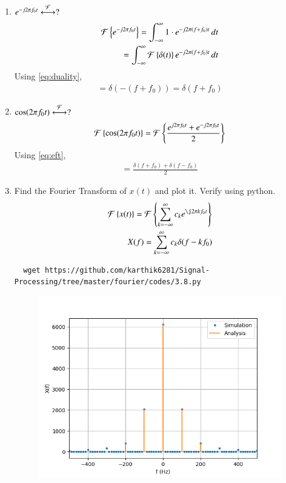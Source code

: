 \documentclass[journal,12pt,twocolumn]{IEEEtran}
\renewcommand\thesection{\arabic{section}}
\begin{document}
\begin{enumerate}[label=\thesection.\arabic*
,ref=\thesection.\theenumi]
\begin{align}
 \end{align}
 Since $e^{-j2\pi ft}=1$ for t=0 and remaining integrand is zero for t $\neq0$.
 \begin{align}
  =\int_{-\infty}^{\infty}\delta(t)\,dt\\
  =1
 \end{align}
 \item $e^{-j2\pi f_0t}\overset{\mathcal{F}}{ \longleftrightarrow}?$\\
 \solution 
 \begin{align}
 \mathcal{F}\left\{e^{-j2\pi f_0t}\right\}=\int_{-\infty}^{\infty}1\cdot e^{-j2\pi\left(f+f_0\right)t}\,dt\\
 =\int_{-\infty}^{\infty}\mathcal{F}\left\{\delta(t)\right\} e^{-j2\pi\left(f+f_0\right)t}\,dt
 \end{align}
 Using \eqref{eq:duality},
 \begin{align}
 \label{eq:eft}
 =\delta(-(f+f_0))=\delta(f+f_0)
 \end{align}
 \item $\cos(2\pi f_0t)\overset{\mathcal{F}}{ \longleftrightarrow}?$\\
 \solution
 \begin{align}
 \mathcal{F}\left\{\cos(2\pi f_0t)\right\}=\mathcal{F}\left\{\frac{{e^{j2\pi f_0t}+e^{-j2\pi f_0t}}}{2}\right\}
 \end{align}
 Using \eqref{eq:eft},
 \begin{align}
 =\frac{\delta(f+f_0)+\delta(f-f_0)}{2}
 \end{align}
 \item Find the Fourier Transform of $x(t)$ and plot it.  Verify using python.\\
 \solution
 \begin{align}
  \foutranin{x(t)}=\foutranin{\sum_{k = -\infty}^{\infty}c_ke^{\j2\pi kf_0 t}}\\
  X(f)=\sum_{k = -\infty}^{\infty}c_k\delta(f-kf_0)
  \end{align}
  \begin{lstlisting}
  wget https://github.com/karthik6281/Signal-Processing/tree/master/fourier/codes/3.8.py
  \end{lstlisting}
  \begin{figure}[!ht]
    \centering
    \includegraphics[width=\columnwidth]{./figs/3.8}

\end{figure}
\end{enumerate}
\end{document}
